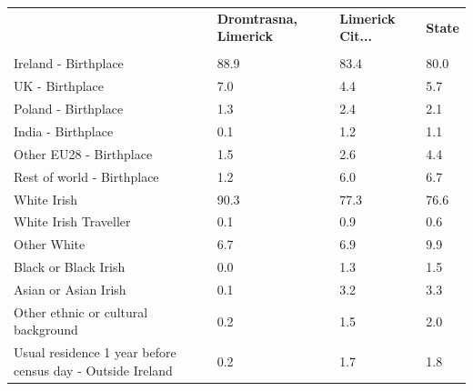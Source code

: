\documentclass{article}
\begin{document}
\pagebreak
\begin{table}[h]	
\centering
		\begin{tabular}{KTTT}
  \hline
& \textbf{Dromtrasna, Limerick} & \textbf{Limerick Cit...} & \textbf{State}\\ 
  \hline
    \\ 
    \hline
Ireland - Birthplace & 88.9& 83.4& 80.0\\
UK - Birthplace & 7.0& 4.4& 5.7\\
Poland - Birthplace & 1.3& 2.4& 2.1\\
India - Birthplace & 0.1& 1.2& 1.1\\
Other EU28 - Birthplace & 1.5& 2.6& 4.4\\
Rest of world - Birthplace & 1.2& 6.0& 6.7\\
    \hline
White Irish & 90.3& 77.3& 76.6\\
White Irish Traveller & 0.1& 0.9& 0.6\\
Other White & 6.7& 6.9& 9.9\\
Black or Black Irish & 0.0& 1.3& 1.5\\
Asian or Asian Irish & 0.1& 3.2& 3.3\\
Other ethnic or cultural background & 0.2& 1.5& 2.0\\
    \hline
Usual residence 1 year before census day - Outside Ireland & 0.2& 1.7& 1.8\\


\end{tabular}
\end{table}
\end{document}
